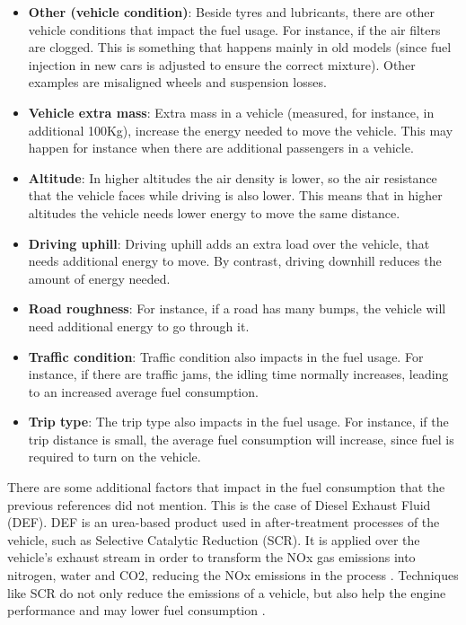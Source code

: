 \begin{itemize}
\item \textbf{Other (vehicle condition)}: Beside tyres and lubricants, there are other vehicle conditions that impact the fuel usage. For instance, if the air filters are clogged. This is something that happens mainly in old models (since fuel injection in new cars is adjusted to ensure the correct mixture). Other examples are misaligned wheels and suspension losses. 
\item \textbf{Vehicle extra mass}: Extra mass in a vehicle (measured, for instance, in additional 100Kg), increase the energy needed to move the vehicle. This may happen for instance when there are additional passengers in a vehicle.
\item \textbf{Altitude}: In higher altitudes the air density is lower, so the air resistance that the vehicle faces while driving is also lower. This means that in higher altitudes the vehicle needs lower energy to move the same distance.
\item \textbf{Driving uphill}: Driving uphill adds an extra load over the vehicle, that needs additional energy to move. By contrast, driving downhill reduces the amount of energy needed.
\item \textbf{Road roughness}: For instance, if a road has many bumps, the vehicle will need additional energy to go through it. 
\item \textbf{Traffic condition}: Traffic condition also impacts in the fuel usage. For instance, if there are traffic jams, the idling time normally increases, leading to an increased average fuel consumption.
\item \textbf{Trip type}: The trip type also impacts in the fuel usage. For instance, if the trip distance is small, the average fuel consumption will increase, since fuel is required to turn on the vehicle.
\end{itemize}

There are some additional factors that impact in the fuel consumption that the previous references did not mention. This is the case of Diesel Exhaust Fluid (DEF). DEF is an urea-based product used in after-treatment processes of the vehicle, such as Selective Catalytic Reduction (SCR). It is applied over the vehicle's exhaust stream in order to transform the NOx gas emissions into nitrogen, water and CO2, reducing the NOx emissions in the process \parencite{betageri2016effects}. Techniques like SCR do not only reduce the emissions of a vehicle, but also help the engine performance and may lower fuel consumption \parencite{chen2015nonlinear, chen2013integrated}.

